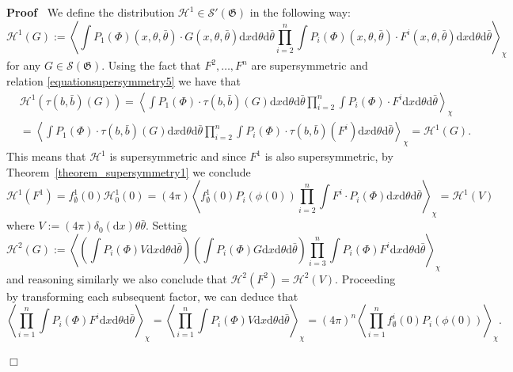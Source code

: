 \documentclass[a4paper,10pt]{article}
\newcommand{\assign}{:=}
\newcommand{\mathd}{\mathrm{d}}
\newenvironment{proof}{\noindent\textbf{Proof\ }}{\hspace*{\fill}$\Box$\medskip}
\begin{document}
\begin{proof}
  We define the distribution $\mathcal{H}^1 \in \mathcal{S}' (\mathfrak{G})$
  in the following way:
  \[ \mathcal{H}^1 (G) \assign \left\langle \int P_1 (\Phi) (x, \theta,
     \bar{\theta}) \cdot G (x, \theta, \bar{\theta}) \mathd x \mathd \theta
     \mathd \bar{\theta} \prod^n_{i = 2} \int P_i (\Phi) (x, \theta,
     \bar{\theta}) \cdot F^i (x, \theta, \bar{\theta}) \mathd x \mathd \theta
     \mathd \bar{\theta} \right\rangle_{\chi} \]
  for any $G \in \mathcal{S} (\mathfrak{G})$. Using the fact that $F^2,
  \ldots, F^n$ are supersymmetric and relation
  {\eqref{equationsupersymmetry5}} we have that
  \begin{eqnarray}
    & \mathcal{H}^1 (\tau (b, \bar{b}) (G)) = \left\langle \int P_1 (\Phi)
    \cdot \tau (b, \bar{b}) (G) \mathd x \mathd \theta \mathd \bar{\theta}
    \prod^n_{i = 2} \int P_i (\Phi) \cdot F^i \mathd x \mathd \theta \mathd
    \bar{\theta} \right\rangle_{\chi} & _{} \nonumber\\
    & = \left\langle \int P_1 (\Phi) \cdot \tau (b, \bar{b}) (G) \mathd x
    \mathd \theta \mathd \bar{\theta} \prod^n_{i = 2} \int P_i (\Phi) \cdot
    \tau (b, \bar{b}) (F^i) \mathd x \mathd \theta \mathd \bar{\theta}
    \right\rangle_{\chi} = \mathcal{H}^1 (G) . &  \nonumber
  \end{eqnarray}
  This means that $\mathcal{H}^1$ is supersymmetric and since $F^1$ is also
  supersymmetric, by Theorem~\ref{theorem_supersymmetry1} we conclude
  \[ \mathcal{H}^1 (F^1) = f^1_{\emptyset} (0) \mathcal{H}^1_0 (0) = (4 \pi)
     \left\langle f^1_{\emptyset} (0) P_i (\phi (0)) \prod^n_{i = 2} \int F^i
     \cdot P_i (\Phi) \mathd x \mathd \theta \mathd \bar{\theta}
     \right\rangle_{\chi} = \mathcal{H}^1 (V) \]
  where $V \assign (4 \pi) \delta_0 (\mathd x) \theta \bar{\theta}$. Setting
  \[ \mathcal{H}^2 (G) \assign \left\langle \left( \int P_i (\Phi) V \mathd x
     \mathd \theta \mathd \bar{\theta} \right) \left( \int P_i (\Phi) G \mathd
     x \mathd \theta \mathd \bar{\theta} \right) \prod^n_{i = 3} \int P_i
     (\Phi) F^i \mathd x \mathd \theta \mathd \bar{\theta}
     \right\rangle_{\chi} \]
  and reasoning similarly we also conclude that $\mathcal{H}^2 (F^2)
  =\mathcal{H}^2 (V)$. Proceeding by transforming each subsequent factor, we
  can deduce that
  \[ \left\langle \prod^n_{i = 1} \int P_i (\Phi) F^i \mathd x \mathd \theta
     \mathd \bar{\theta} \right\rangle_{\chi} = \left\langle \prod^n_{i = 1}
     \int P_i (\Phi) V \mathd x \mathd \theta \mathd \bar{\theta}
     \right\rangle_{\chi} = (4 \pi)^n \left\langle \prod_{i = 1}^n
     f^i_{\emptyset} (0) P_i (\phi (0)) \right\rangle_{\chi} . \]
  
\end{proof}
\end{document}
